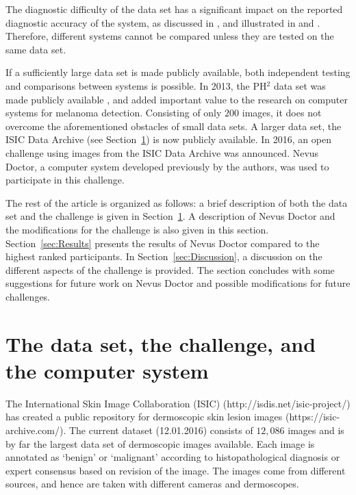 \documentclass[a4paper,12pt]{article}
\begin{document}
The diagnostic difficulty of the data set has a significant impact on the reported diagnostic accuracy of the system, as discussed in \cite{Rosado2003Accuracy}, and illustrated in \cite{Malvehy2014Clinical} and \cite{Mollersen2015Computeraided}. Therefore, different systems cannot be compared unless they are tested on the same data set. 

If a sufficiently large data set is made publicly available, both independent testing and comparisons between systems is possible. In 2013, the PH$^2$ data set was made publicly available \citep{Mendonca2013PH2}, and added important value to the research on computer systems for melanoma detection. Consisting of only $200$ images, it does not overcome the aforementioned obstacles of small data sets. A larger data set, the ISIC Data Archive (see Section~\ref{sec:Challenge}) is now publicly available. In 2016, an open challenge using images from the ISIC Data Archive was announced. Nevus Doctor, a computer system developed previously by the authors, was used to participate in this challenge.

The rest of the article is organized as follows: a brief description of both the data set and the challenge is given in Section~\ref{sec:Challenge}. A description of Nevus Doctor and the modifications for the challenge is also given in this section. Section~\ref{sec:Results} presents the results of Nevus Doctor compared to the highest ranked participants. In Section~\ref{sec:Discussion}, a discussion on the different aspects of the challenge is provided. The section concludes with some suggestions for future work on Nevus Doctor and possible modifications for future challenges. 

\section{The data set, the challenge, and the computer system} \label{sec:Challenge}

The International Skin Image Collaboration (ISIC) (http://isdis.net/isic-project/) has created a public repository for dermoscopic skin lesion images (https://isic-archive.com/). The current dataset (12.01.2016) consists of $12,086$ images and is by far the largest data set of dermoscopic images available. Each image is annotated as `benign' or `malignant' according to histopathological diagnosis or expert consensus based on revision of the image. The images come from different sources, and hence are taken with different cameras and dermoscopes. 
\end{document}

